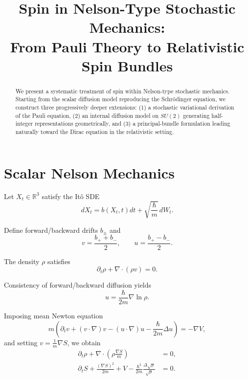 \documentclass[12pt]{article}
\title{Spin in Nelson-Type Stochastic Mechanics:\\
From Pauli Theory to Relativistic Spin Bundles}
\author{}
\date{}
\begin{document}
\maketitle

\begin{abstract}
We present a systematic treatment of spin within Nelson-type stochastic
mechanics. Starting from the scalar diffusion model reproducing the
Schr\"odinger equation, we construct three progressively deeper
extensions: (1) a stochastic variational derivation of the Pauli equation,
(2) an internal diffusion model on $SU(2)$ generating half-integer
representations geometrically, and (3) a principal-bundle formulation
leading naturally toward the Dirac equation in the relativistic setting.
\end{abstract}

\tableofcontents

\section{Scalar Nelson Mechanics}

Let $X_t \in \mathbb{R}^3$ satisfy the It\^o SDE
\begin{equation}
dX_t = b(X_t,t) dt + \sqrt{\frac{\hbar}{m}}\, dW_t.
\end{equation}

Define forward/backward drifts $b_\pm$ and
\begin{equation}
v = \frac{b_+ + b_-}{2}, \qquad
u = \frac{b_+ - b_-}{2}.
\end{equation}

The density $\rho$ satisfies
\begin{equation}
\partial_t \rho + \nabla\cdot(\rho v)=0.
\end{equation}

Consistency of forward/backward diffusion yields
\begin{equation}
u = \frac{\hbar}{2m}\nabla \ln \rho.
\end{equation}

Imposing mean Newton equation
\begin{equation}
m\left(\partial_t v + (v\cdot\nabla)v - (u\cdot\nabla)u
- \frac{\hbar}{2m}\Delta u\right)
= -\nabla V,
\end{equation}
and setting $v=\frac{1}{m}\nabla S$, we obtain
\begin{align}
\partial_t \rho + \nabla\cdot\left(\rho \frac{\nabla S}{m}\right)&=0,\\
\partial_t S + \frac{(\nabla S)^2}{2m}
+ V - \frac{\hbar^2}{2m}\frac{\Delta\sqrt{\rho}}{\sqrt{\rho}}&=0.
\end{align}
\end{document}
